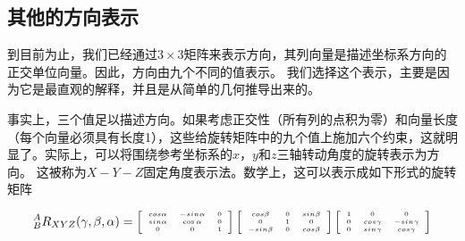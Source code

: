 \subsection{其他的方向表示}


到目前为止，我们已经通过$3\times 3$矩阵来表示方向，其列向量是描述坐标系方向的正交单位向量。因此，方向由九个不同的值表示。 我们选择这个表示，主要是因为它是最直观的解释，并且是从简单的几何推导出来的。


事实上，三个值足以描述方向。如果考虑正交性（所有列的点积为零）和向量长度（每个向量必须具有长度1），这些给旋转矩阵中的九个值上施加六个约束，这就明显了。实际上，可以将围绕参考坐标系的$x$，$y$和$z$三轴转动角度的旋转表示为方向。 这被称为$X-Y-Z$固定角度表示法。数学上，这可以表示成如下形式的旋转矩阵

\begin{equation}
\tiny
^A_BR_{XYZ}(\gamma,\beta,\alpha)=\left[\begin{array}{ccc}cos\alpha & -sin\alpha & 0\\sin\alpha & \cos\alpha & 0\\0 & 0 & 1\end{array}\right]\left[\begin{array}{ccc}cos\beta& 0 & sin\beta\\0 & 1 & 0\\-sin\beta & 0 & cos\beta\end{array}\right]\left[\begin{array}{ccc}1 & 0 & 0 \\0 & cos\gamma & -sin\gamma\\0 & sin\gamma & cos\gamma\end{array}\right]
\end{equation}

